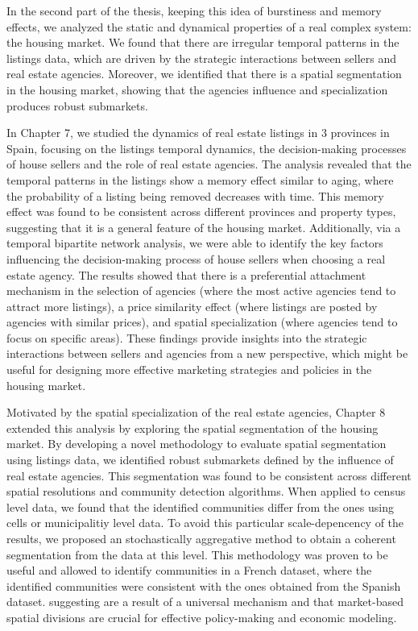 In the second part of the thesis, keeping this idea of burstiness and memory effects, we analyzed the static and dynamical properties of a real complex system: the housing market. We found that there are irregular temporal patterns in the listings data, which are driven by the strategic interactions between sellers and real estate agencies. Moreover, we identified that there is a spatial segmentation in the housing market, showing that the agencies influence and specialization produces robust submarkets.

In Chapter 7, we studied the dynamics of real estate listings in 3 provinces in Spain, focusing on the listings temporal dynamics, the decision-making processes of house sellers and the role of real estate agencies. The analysis revealed that the temporal patterns in the listings show a memory effect similar to aging, where the probability of a listing being removed decreases with time. This memory effect was found to be consistent across different provinces and property types, suggesting that it is a general feature of the housing market. Additionally, via a temporal bipartite network analysis, we were able to identify the key factors influencing the decision-making process of house sellers when choosing a real estate agency. The results showed that there is a preferential attachment mechanism in the selection of agencies (where the most active agencies tend to attract more listings), a price similarity effect (where listings are posted by agencies with similar prices), and spatial specialization (where agencies tend to focus on specific areas). These findings provide insights into the strategic interactions between sellers and agencies from a new perspective, which might be useful for designing more effective marketing strategies and policies in the housing market.

Motivated by the spatial specialization of the real estate agencies, Chapter 8 extended this analysis by exploring the spatial segmentation of the housing market. By developing a novel methodology to evaluate spatial segmentation using listings data, we identified robust submarkets defined by the influence of real estate agencies. This segmentation was found to be consistent across different spatial resolutions and community detection algorithms. When applied to census level data, we found that the identified communities differ from the ones using cells or municipalitiy level data. To avoid this particular scale-depencency of the results, we proposed an stochastically aggregative method to obtain a coherent segmentation from the data at this level. This methodology was proven to be useful and allowed to identify communities in a French dataset, where the identified communities were consistent with the ones obtained from the Spanish dataset. suggesting are a result of a universal mechanism and that market-based spatial divisions are crucial for effective policy-making and economic modeling.

